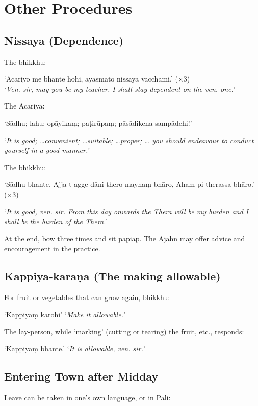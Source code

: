 \chapter{Other Procedures}

\section{Nissaya (Dependence)}
\label{nissaya}

The bhikkhu:

‘Ācariyo me bhante hohi, āyasmato nissāya vacchāmi.’ (×3)\\
‘\emph{Ven. sir, may you be my teacher. I shall stay dependent on the ven. one.}’

The Ācariya:

‘Sādhu; lahu; opāyikaṃ; paṭirūpaṃ; pāsādikena sampādehi!’

‘\emph{It is good; …convenient; …suitable; …proper; … you should endeavour to
  conduct yourself in a good manner.}’


The bhikkhu:

‘Sādhu bhante. Ajja-t-agge-dāni thero mayhaṃ bhāro, Aham-pi therassa bhāro.’ (×3)

‘\emph{It is good, ven. sir. From this day onwards the Thera will be my burden and I
shall be the burden of the Thera.}’


At the end, bow three times and sit papiap. The Ajahn may offer advice and
encouragement in the practice.

\section{Kappiya-karaṇa (The making allowable)}

For fruit or vegetables that can grow again, bhikkhu:

‘Kappiyaṃ karohi’ ‘\emph{Make it allowable.}’

The lay-person, while ‘marking’ (cutting or tearing) the fruit, etc., responds:

‘Kappiyaṃ bhante.’ ‘\emph{It is allowable, ven. sir.}’ 

\section{Entering Town after Midday}

Leave can be taken in one's own language, or in Pali:

